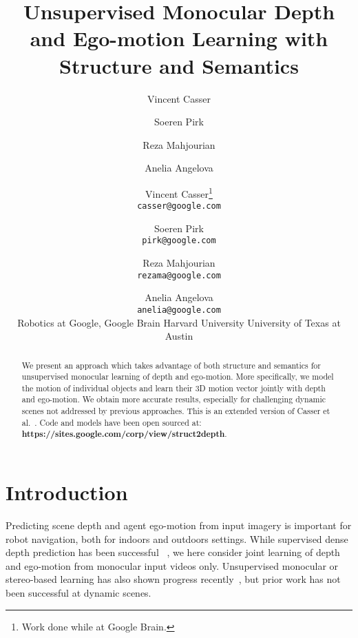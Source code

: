 \documentclass[10pt,twocolumn,letterpaper]{article}
\begin{document}
\title{Unsupervised Monocular Depth and Ego-motion Learning with \\Structure and Semantics}

\author{Vincent Casser         \and
        Soeren Pirk \and 
        Reza Mahjourian \and
        Anelia Angelova
}

\author{Vincent Casser\thanks{Work done while at Google Brain.} \\
{\tt\small casser@google.com}
\and
Soeren Pirk\\
{\tt\small pirk@google.com} \\
\and
Reza Mahjourian\\
{\tt\small rezama@google.com} \\
\and
Anelia Angelova\\
{\tt\small anelia@google.com}\\
\vspace{0.1cm}
  Robotics at Google, Google Brain  Harvard University  University of Texas at Austin
}
\maketitle

\begin{abstract}
We present an approach which takes advantage of both structure and semantics for unsupervised monocular learning of depth and ego-motion. More specifically, we model the motion of individual objects and learn their 3D motion vector jointly with depth and ego-motion. We obtain more accurate results, especially for challenging dynamic scenes not addressed by previous approaches. This is an extended version of Casser et al.~\cite{casser2019depth}. Code and models have been open sourced at: 
\textbf{https://sites.google.com/corp/view/struct2depth}.
\end{abstract}

\section{Introduction}

\noindent Predicting scene depth  and agent ego-motion from input imagery is important for robot navigation, both for indoors and outdoors settings.  
While supervised dense depth prediction has been successful ~\cite{eigen2014depth}, we here consider joint learning of depth and ego-motion from monocular input videos only. Unsupervised monocular or stereo-based learning has also shown progress recently~\cite{zhou2017unsupervised,godard2017monodepth}, but prior work has not been successful at dynamic scenes.
\end{document}
